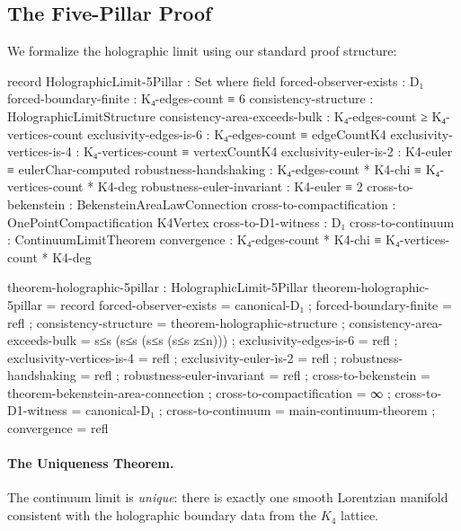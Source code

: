 \documentclass[11pt,a4paper]{book}
\begin{document}
\subsection{The Five-Pillar Proof}

We formalize the holographic limit using our standard proof structure:

\begin{code}
record HolographicLimit-5Pillar : Set where
  field
    forced-observer-exists        : D₁
    forced-boundary-finite        : K₄-edges-count ≡ 6
    consistency-structure         : HolographicLimitStructure
    consistency-area-exceeds-bulk : K₄-edges-count ≥ K₄-vertices-count
    exclusivity-edges-is-6        : K₄-edges-count ≡ edgeCountK4
    exclusivity-vertices-is-4     : K₄-vertices-count ≡ vertexCountK4
    exclusivity-euler-is-2        : K4-euler ≡ eulerChar-computed
    robustness-handshaking        : K₄-edges-count * K4-chi ≡ K₄-vertices-count * K4-deg
    robustness-euler-invariant    : K4-euler ≡ 2
    cross-to-bekenstein           : BekensteinAreaLawConnection
    cross-to-compactification     : OnePointCompactification K4Vertex
    cross-to-D1-witness           : D₁
    cross-to-continuum            : ContinuumLimitTheorem
    convergence                   : K₄-edges-count * K4-chi ≡ K₄-vertices-count * K4-deg

theorem-holographic-5pillar : HolographicLimit-5Pillar
theorem-holographic-5pillar = record
  { forced-observer-exists        = canonical-D₁
  ; forced-boundary-finite        = refl
  ; consistency-structure         = theorem-holographic-structure
  ; consistency-area-exceeds-bulk = s≤s (s≤s (s≤s (s≤s z≤n)))
  ; exclusivity-edges-is-6        = refl
  ; exclusivity-vertices-is-4     = refl
  ; exclusivity-euler-is-2        = refl
  ; robustness-handshaking        = refl
  ; robustness-euler-invariant    = refl
  ; cross-to-bekenstein           = theorem-bekenstein-area-connection
  ; cross-to-compactification     = ∞
  ; cross-to-D1-witness           = canonical-D₁
  ; cross-to-continuum            = main-continuum-theorem
  ; convergence                   = refl
  }
\end{code}

\paragraph{The Uniqueness Theorem.}

The continuum limit is \emph{unique}: there is exactly one smooth 
Lorentzian manifold consistent with the holographic boundary data from the $K_4$ lattice. 
\end{document}

